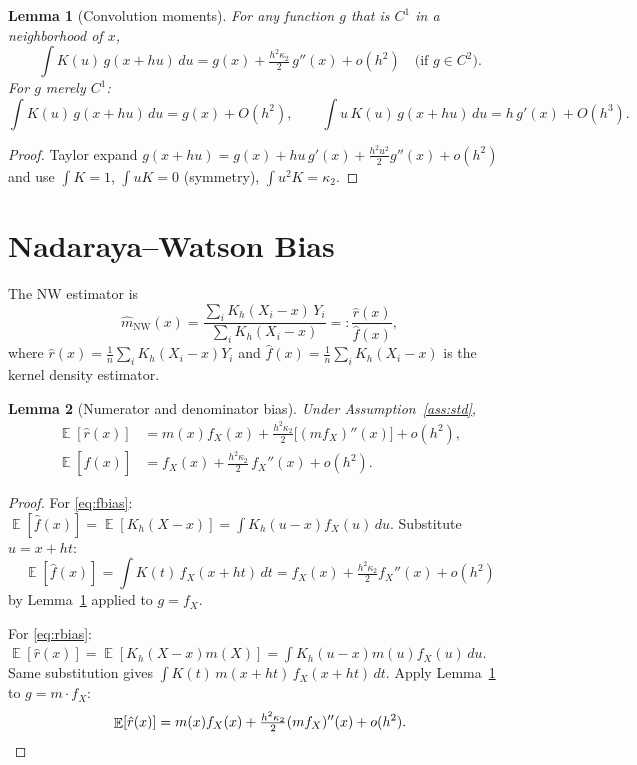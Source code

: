 \documentclass[11pt]{article}
\theoremstyle{plain}
\newtheorem{lemma}{Lemma}
\theoremstyle{definition}
\theoremstyle{remark}
\DeclareMathOperator{\E}{\mathbb{E}}
\begin{document}
\begin{lemma}[Convolution moments]\label{lem:conv}
For any function $g$ that is $C^1$ in a neighborhood of $x$,
\begin{equation}\label{eq:conv1}
\int K(u)\,g(x+hu)\,du = g(x) + \tfrac{h^2 \kappa_2}{2}\,g''(x) + o(h^2)
\quad\text{(if $g \in C^2$).}
\end{equation}
For $g$ merely $C^1$:
\begin{equation}\label{eq:conv1prime}
\int K(u)\,g(x+hu)\,du = g(x) + O(h^2),\qquad
\int u\,K(u)\,g(x+hu)\,du = h\, g'(x) + O(h^3).
\end{equation}
\end{lemma}

\begin{proof}
Taylor expand $g(x+hu) = g(x) + hu\,g'(x) + \tfrac{h^2 u^2}{2}g''(x) + o(h^2)$
and use $\int K = 1$, $\int u K = 0$ (symmetry), $\int u^2 K = \kappa_2$.
\end{proof}

\section{Nadaraya--Watson Bias}\label{sec:nw}

The NW estimator is
\[
  \hat m_{\text{NW}}(x)
   = \frac{\sum_i K_h(X_i - x)\,Y_i}{\sum_i K_h(X_i - x)}
   =: \frac{\hat r(x)}{\hat f(x)},
\]
where $\hat r(x) = \tfrac{1}{n}\sum_i K_h(X_i - x) Y_i$ and
$\hat f(x) = \tfrac{1}{n}\sum_i K_h(X_i - x)$ is the kernel density estimator.

\begin{lemma}[Numerator and denominator bias]\label{lem:nwbias}
Under Assumption~\ref{ass:std},
\begin{align}
\E[\hat r(x)] &= m(x) f_X(x) + \tfrac{h^2 \kappa_2}{2}\bigl[(m f_X)''(x)\bigr] + o(h^2), \label{eq:rbias}\\
\E[\hat f(x)] &= f_X(x) + \tfrac{h^2 \kappa_2}{2}\,f_X''(x) + o(h^2). \label{eq:fbias}
\end{align}
\end{lemma}

\begin{proof}
For \eqref{eq:fbias}: $\E[\hat f(x)] = \E[K_h(X-x)] = \int K_h(u-x)f_X(u)\,du$.
Substitute $u = x + ht$:
\[
\E[\hat f(x)] = \int K(t)\,f_X(x+ht)\,dt = f_X(x) + \tfrac{h^2\kappa_2}{2} f_X''(x) + o(h^2)
\]
by Lemma~\ref{lem:conv} applied to $g = f_X$.

\smallskip
For \eqref{eq:rbias}: $\E[\hat r(x)] = \E[K_h(X-x) m(X)] = \int K_h(u-x) m(u) f_X(u)\,du$.
Same substitution gives $\int K(t)\,m(x+ht)\,f_X(x+ht)\,dt$. Apply
Lemma~\ref{lem:conv} to $g = m \cdot f_X$:
\[
\E[\hat r(x)] = m(x) f_X(x) + \tfrac{h^2\kappa_2}{2}(m f_X)''(x) + o(h^2). \qedhere
\]
\end{proof}
\end{document}
